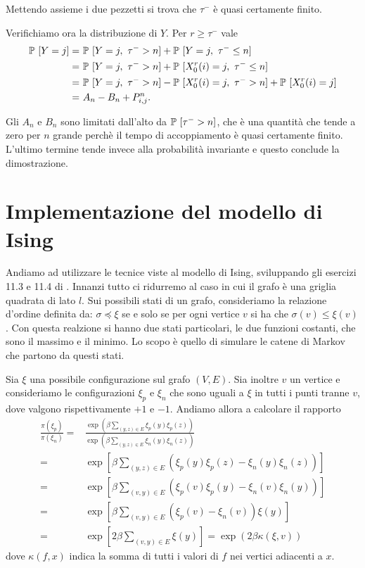 \documentclass[]{marticle}
\begin{document}
Mettendo assieme i due pezzetti si trova che $\tau^-$ \`e quasi certamente
finito. 

Verifichiamo ora la distribuzione di $Y$. Per $r \geq \tau^-$ vale
\begin{align*}
    \mathbb{P}\ [Y=j] =&\ \mathbb{P}\ [Y=j,\ \tau^- > n] + \mathbb{P}\ [Y=j,\ \tau^- \leq n] \\
    =&\ \mathbb{P}\ [Y=j,\ \tau^- > n] + \mathbb{P}\ [X_0^r(i)=j,\ \tau^- \leq n] \\
    =&\ \mathbb{P}\ [Y=j,\ \tau^- > n] - \mathbb{P}\ [X_0^r(i)=j,\ \tau^- > n] 
            + \mathbb{P}\ [X_0^r(i)=j] \\
    =&\ A_n - B_n + P^n_{i,j}.
\end{align*}

Gli $A_n$ e $B_n$ sono limitati dall'alto da $\mathbb{P}\ [\tau^- > n]$, che \`e una
quantit\`a che tende a zero per $n$ grande perch\`e il tempo di accoppiamento
\`e quasi certamente finito. L'ultimo termine tende invece alla probabilit\`a
invariante e questo conclude la dimostrazione.


\section{Implementazione del modello di Ising}
Andiamo ad utilizzare le tecnice viste al modello di Ising, sviluppando gli
esercizi 11.3 e 11.4 di \cite{haggstrom}. Innanzi tutto ci ridurremo al caso in
cui il grafo \`e una griglia quadrata di lato $l$. Sui possibili stati di un
grafo, consideriamo la relazione d'ordine definita da: $\sigma \preceq \xi$ se e
solo se per ogni vertice $v$ si ha che $\sigma(v) \leq \xi(v)$.  Con questa
realzione si hanno due stati particolari, le due funzioni costanti, che sono il
massimo e il minimo. Lo scopo \`e quello di simulare le catene di Markov che
partono da questi stati. 

Sia $\xi$ una possibile configurazione sul grafo $(V,E)$. Sia inoltre $v$ un
vertice e consideriamo le configurazioni $\xi_p$ e $\xi_n$ che sono uguali a
$\xi$ in tutti i punti tranne $v$, dove valgono rispettivamente $+1$ e $-1$.
Andiamo allora a calcolare il rapporto
\begin{align*}
    \frac{\pi(\xi_p)}{\pi(\xi_n)} =& 
    \frac{\exp (\beta \sum_{(y,z)\in E} \xi_p(y)\xi_p(z))} {\exp
            (\beta\sum_{(y,z)\in E} \xi_n(y)\xi_n(z))} \\
    =& \exp \left[\beta\sum_{(y,z)\in E}
        \left(\xi_p(y)\xi_p(z)-\xi_n(y)\xi_n(z)\right)\right ]\\
    =& \exp \left[\beta\sum_{(v,y)\in E}
        \left(\xi_p(v)\xi_p(y)-\xi_n(v)\xi_n(y)\right)\right ]\\
    =& \exp \left[\beta\sum_{(v,y)\in E}
        \left(\xi_p(v)-\xi_n(v)\right)\xi(y)\right ]\\
    =& \exp \left[2\beta\sum_{(v,y)\in E} \xi(y)\right ]
    = \exp \left(2\beta\kappa(\xi,v)\right)
\end{align*}
dove $\kappa(f,x)$ indica la somma di tutti i valori di $f$ nei vertici
adiacenti a $x$.
\end{document}
